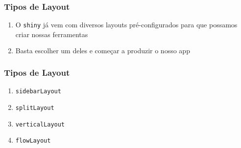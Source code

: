 \documentclass[12pt, compress, usetitleprogressbar]{beamer}\usepackage[]{graphicx}\usepackage[]{color}
\begin{document}
\begin{frame}

\frametitle{Tipos de Layout}

\begin{enumerate}[label=$\bullet$, leftmargin=*]

  \item O \texttt{shiny} já vem com diversos layouts pré-configurados para que possamos criar nossas ferramentas

  \item Basta escolher um deles e começar a produzir o nosso app

\end{enumerate}

\end{frame}







\begin{frame}

\frametitle{Tipos de Layout}

\begin{enumerate}[label=$\bullet$, leftmargin=*]

  \item \texttt{sidebarLayout}

  \item \texttt{splitLayout}

  \item \texttt{verticalLayout}

  \item \texttt{flowLayout}

\end{enumerate}

\end{frame}



















\end{document}
